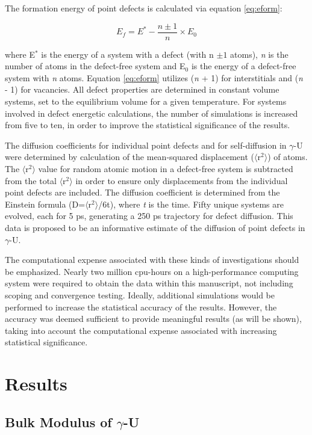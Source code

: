 \documentclass[review]{elsarticle}
\begin{document}
The formation energy of point defects is calculated via equation \ref{eq:eform}: 

\begin{equation}
\label{eq:eform}
E_f = E^* - \frac{n \pm 1}{n} \times E_0
\end{equation}

where E$^{*}$ is the energy of a system with a defect (with n $\pm 1$ atoms), \textit{n} is the number of atoms in the defect-free system and E$_{0}$ is the energy of a defect-free system with \textit{n} atoms. Equation \ref{eq:eform} utilizes (\textit{n} + 1) for interstitials and (\textit{n} - 1) for vacancies. All defect properties are determined in constant volume systems, set to the equilibrium volume for a given temperature. For systems involved in defect energetic calculations, the number of simulations is increased from five to ten, in order to improve the statistical significance of the results.

The diffusion coefficients for individual point defects and for self-diffusion in $\gamma$-U were determined by calculation of the mean-squared displacement ($\langle$r$^2$$\rangle$) of atoms. The $\langle$r$^2$$\rangle$ value for random atomic motion in a defect-free system is subtracted from the total $\langle$r$^2$$\rangle$ in order to ensure only displacements from the individual point defects are included. The diffusion coefficient is determined from the Einstein formula (D=$\langle$r$^2$$\rangle$/6t), where \textit{t} is the time. Fifty unique systems are evolved, each for 5 ps, generating a 250 ps trajectory for defect diffusion. This data is proposed to be an informative estimate of the diffusion of point defects in $\gamma$-U. 

The computational expense associated with these kinds of investigations should be emphasized. Nearly two million cpu-hours on a high-performance computing system were required to obtain the data within this manuscript, not including scoping and convergence testing. Ideally, additional simulations would be performed to increase the statistical accuracy of the results. However, the accuracy was deemed sufficient to provide meaningful results (as will be shown), taking into account the computational expense associated with increasing statistical significance. 

\section{Results}
\subsection{Bulk Modulus of $\gamma$-U}
\end{document}
